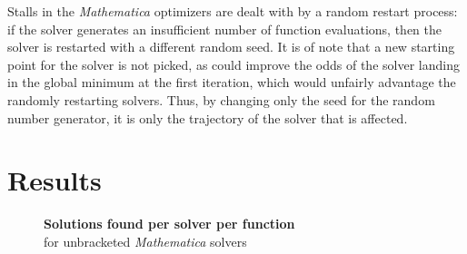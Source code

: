 \documentclass[12pt]{article}
\begin{document}
Stalls in the \emph{Mathematica} optimizers are dealt with by a random
restart process: if the solver generates an insufficient number of function
evaluations, then the solver is restarted with a different random seed.
It is of note that a new starting point for the solver is not picked, as
could improve the odds of the solver landing in the global minimum at the
first iteration, which would unfairly advantage the randomly restarting
solvers. Thus, by changing only the seed for the random number generator,
it is only the trajectory of the solver that is affected.

\pagebreak

\section{Results}
\begin{figure}[H]
    \begin{center}
        {\large {\bfseries Solutions found per solver per function}\\
        for unbracketed \emph{Mathematica} solvers}


\end{center}
\end{figure}
\end{document}
